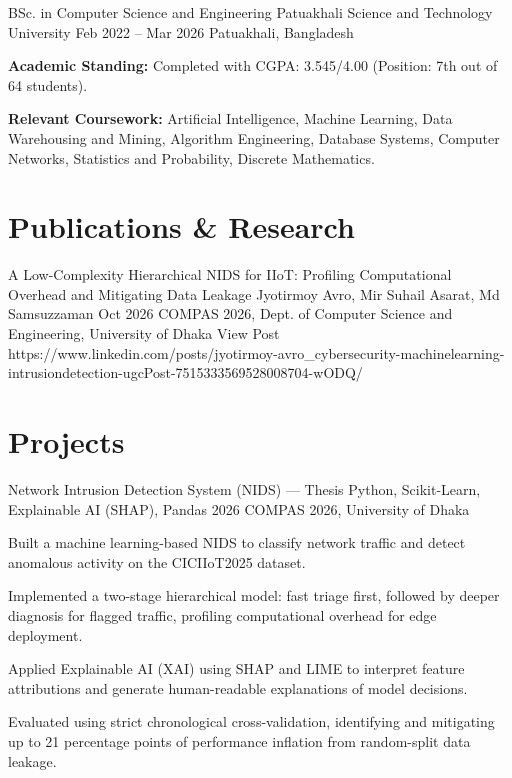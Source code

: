 \documentclass[11pt, a4paper]{article}
\begin{document}
\cvEducation
    {BSc. in Computer Science and Engineering}
    {Patuakhali Science and Technology University}
    {Feb 2022 – Mar 2026}
    {Patuakhali, Bangladesh}
    {
        \item \textbf{Academic Standing:} Completed with CGPA: 3.545/4.00 (Position: 7th out of 64 students).
        \item \textbf{Relevant Coursework:} Artificial Intelligence, Machine Learning, Data Warehousing and Mining, Algorithm Engineering, Database Systems, Computer Networks, Statistics and Probability, Discrete Mathematics.
    }

\section{Publications \& Research}
\cvPublication
    {A Low-Complexity Hierarchical NIDS for IIoT: Profiling Computational Overhead and Mitigating Data Leakage}
    {Jyotirmoy Avro, Mir Suhail Asarat, Md Samsuzzaman}
    {Oct 2026}
    {COMPAS 2026, Dept. of Computer Science and Engineering, University of Dhaka}
    {View Post}
    {https://www.linkedin.com/posts/jyotirmoy-avro_cybersecurity-machinelearning-intrusiondetection-ugcPost-7515333569528008704-wODQ/}

\section{Projects}
\cvProject
    {Network Intrusion Detection System (NIDS) — Thesis}
    {Python, Scikit-Learn, Explainable AI (SHAP), Pandas}
    {2026}
    {COMPAS 2026, University of Dhaka}
    {
        \item Built a machine learning-based NIDS to classify network traffic and detect anomalous activity on the CICIIoT2025 dataset.
        \item Implemented a two-stage hierarchical model: fast triage first, followed by deeper diagnosis for flagged traffic, profiling computational overhead for edge deployment.
        \item Applied Explainable AI (XAI) using SHAP and LIME to interpret feature attributions and generate human-readable explanations of model decisions.
        \item Evaluated using strict chronological cross-validation, identifying and mitigating up to 21 percentage points of performance inflation from random-split data leakage.
    }
\end{document}
